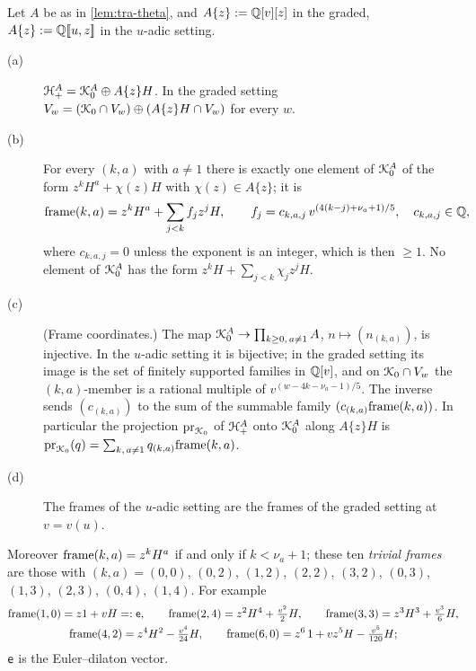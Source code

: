 
\begin{lem}[frames]
\label{lem:tra-frames}
Let $A$ be as in \cref{lem:tra-theta}, and $A\{z\} := \mathbb{Q}[v][z]$ in the graded, $A\{z\} := \mathbb{Q}[\![ u,z ]\!]$ in the $u$-adic setting.
\begin{description}
\item[(a)] $\mathcal{H}^A_+ = \mathcal{K}_{0}^A\oplus A\{z\}H$. In the graded setting $V_w = (\mathcal{K}_{0}\cap V_w)\oplus(A\{z\}H\cap V_w)$ for every $w$.
\item[(b)] For every $(k,a)$ with $a\neq 1$ there is exactly one element of $\mathcal{K}_{0}^A$ of the form $z^kH^a+\chi(z)H$ with $\chi(z)\in A\{z\}$; it is
\[
\mathrm{frame}(k,a) = z^kH^a+\sum_{j<k}f_jz^jH,\qquad f_j = c_{k,a,j}\,v^{(4(k-j)+\nu_a+1)/5},\quad c_{k,a,j}\in\mathbb{Q},
\]
where $c_{k,a,j} = 0$ unless the exponent is an integer, which is then $\geq 1$. No element of $\mathcal{K}_{0}^A$ has the form $z^kH+\sum_{j<k}\chi_jz^jH$.
\item[(c)] (Frame coordinates.) The map $\mathcal{K}_{0}^A\to\prod_{k\geq 0,\,a\neq 1}A$, $n\mapsto(n_{(k,a)})$, is injective. In the $u$-adic setting it is bijective; in the graded setting its image is the set of finitely supported families in $\mathbb{Q}[v]$, and on $\mathcal{K}_{0}\cap V_w$ the $(k,a)$-member is a rational multiple of $v^{(w-4k-\nu_a-1)/5}$. The inverse sends $(c_{(k,a)})$ to the sum of the summable family $(c_{(k,a)}\mathrm{frame}(k,a))$. In particular the projection $\mathrm{pr}_{\mathcal{K}_{0}}$ of $\mathcal{H}^A_+$ onto $\mathcal{K}_{0}^A$ along $A\{z\}H$ is $\mathrm{pr}_{\mathcal{K}_{0}}(q) = \sum_{k,\,a\neq 1}q_{(k,a)}\mathrm{frame}(k,a)$.
\item[(d)] The frames of the $u$-adic setting are the frames of the graded setting at $v = v(u)$.
\end{description}
Moreover $\mathrm{frame}(k,a) = z^kH^a$ if and only if $k<\nu_a+1$; these ten \emph{trivial frames} are those with $(k,a) = (0,0)$, $(0,2)$, $(1,2)$, $(2,2)$, $(3,2)$, $(0,3)$, $(1,3)$, $(2,3)$, $(0,4)$, $(1,4)$. For example
\begin{gather*}
\mathrm{frame}(1,0) = z1+vH =: \mathsf{e},\qquad \mathrm{frame}(2,4) = z^2H^4+\tfrac{v^2}{2}H,\qquad \mathrm{frame}(3,3) = z^3H^3+\tfrac{v^3}{6}H,\\
\mathrm{frame}(4,2) = z^4H^2-\tfrac{v^4}{24}H,\qquad \mathrm{frame}(6,0) = z^6\,1+vz^5H-\tfrac{v^5}{120}H ;
\end{gather*}
$\mathsf{e}$ is the Euler--dilaton vector.
\end{lem}

